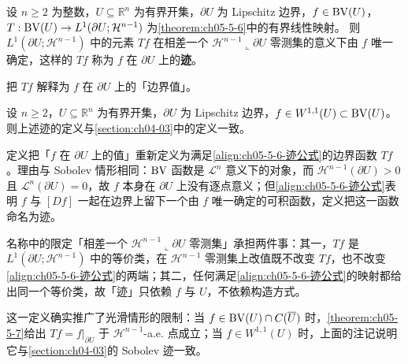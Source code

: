 \documentclass[../../main.tex]{subfiles}%
\begin{document}
\begin{definition}[迹]\label{definition:ch05-5-3}
设 $n\geqslant2$ 为整数，$U\subseteq\mathbb{R}^n$ 为有界开集，$\partial U$ 为 Lipschitz 边界，$f\in\mathrm{BV}(U)$，$T:\mathrm{BV}(U)\to L^1(\partial U;\mathcal{H}^{n-1})$ 为\cref{theorem:ch05-5-6}中的有界线性映射。%
则 $L^1(\partial U;\mathcal{H}^{n-1})$ 中的元素 $Tf$ 在相差一个 $\mathcal{H}^{n-1}\llcorner\partial U$ 零测集的意义下由 $f$ 唯一确定，这样的 $Tf$ 称为 $f$ 在 $\partial U$ 上的\textbf{迹}。
\end{definition}

把 $Tf$ 解释为 $f$ 在 $\partial U$ 上的「边界值」。

\begin{remark}\label{remark:ch05-def-5-3-相容}
设 $n\geqslant2$，$U\subseteq\mathbb{R}^n$ 为有界开集，$\partial U$ 为 Lipschitz 边界，$f\in W^{1,1}(U)\subset\mathrm{BV}(U)$。则上述迹的定义与\cref{section:ch04-03}中的定义一致。%
\end{remark}

\begin{remark}\label{remark:ch05-def-5-3-动机}
定义把「$f$ 在 $\partial U$ 上的值」重新定义为满足\eqref{align:ch05-5-6-迹公式}的边界函数 $Tf$。理由与 Sobolev 情形相同：$\mathrm{BV}$ 函数是 $\mathcal{L}^n$ 意义下的对象，而 $\mathcal{H}^{n-1}(\partial U)>0$ 且 $\mathcal{L}^n(\partial U)=0$，故 $f$ 本身在 $\partial U$ 上没有逐点意义；但\eqref{align:ch05-5-6-迹公式}表明 $f$ 与 $[Df]$ 一起在边界上留下一个由 $f$ 唯一确定的可积函数，定义把这一函数命名为迹。

名称中的限定「相差一个 $\mathcal{H}^{n-1}\llcorner\partial U$ 零测集」承担两件事：其一，$Tf$ 是 $L^1(\partial U;\mathcal{H}^{n-1})$ 中的等价类，在 $\mathcal{H}^{n-1}$ 零测集上改值既不改变 $Tf$，也不改变\eqref{align:ch05-5-6-迹公式}的两端；其二，任何满足\eqref{align:ch05-5-6-迹公式}的映射都给出同一个等价类，故「迹」只依赖 $f$ 与 $U$，不依赖构造方式。

这一定义确实推广了光滑情形的限制：当 $f\in\mathrm{BV}(U)\cap C(\overline{U})$ 时，\cref{theorem:ch05-5-7}给出 $Tf=f|_{\partial U}$ 于 $\mathcal{H}^{n-1}$-a.e. 点成立；当 $f\in W^{1,1}(U)$ 时，上面的注记说明它与\cref{section:ch04-03}的 Sobolev 迹一致。%
\end{remark}
\end{document}
